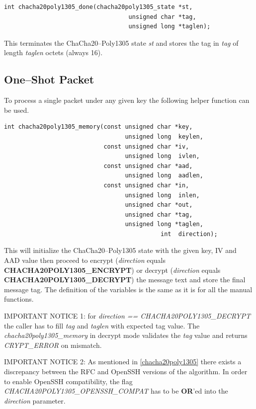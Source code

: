 \documentclass[synpaper]{book}
\begin{document}
\begin{verbatim}
int chacha20poly1305_done(chacha20poly1305_state *st,
                                   unsigned char *tag,
                                   unsigned long *taglen);
\end{verbatim}
This terminates the ChaCha20--Poly1305 state \textit{st} and stores the tag in \textit{tag} of length \textit{taglen} octets (always 16).

\subsection{One--Shot Packet}
To process a single packet under any given key the following helper function can be used.

\begin{verbatim}
int chacha20poly1305_memory(const unsigned char *key,
                                  unsigned long  keylen,
                            const unsigned char *iv,
                                  unsigned long  ivlen,
                            const unsigned char *aad,
                                  unsigned long  aadlen,
                            const unsigned char *in,
                                  unsigned long  inlen,
                                  unsigned char *out,
                                  unsigned char *tag,
                                  unsigned long *taglen,
                                            int  direction);
\end{verbatim}
This will initialize the ChaCha20--Poly1305 state with the given key, IV and AAD value then proceed to
encrypt (\textit{direction} equals \textbf{CHACHA20POLY1305\_ENCRYPT}) or decrypt (\textit{direction} equals
\textbf{CHACHA20POLY1305\_DECRYPT}) the message text and store the final message tag. The definition of the
variables is the same as it is for all the manual functions.

IMPORTANT NOTICE 1: for \textit{direction == CHACHA20POLY1305\_DECRYPT} the caller has to fill \textit{tag} and \textit{taglen} with expected
tag value. The \textit{chacha20poly1305\_memory} in decrypt mode validates the \textit{tag} value and returns \textit{CRYPT\_ERROR} on mismatch.

IMPORTANT NOTICE 2: As mentioned in \ref{chacha20poly1305} there exists a discrepancy between the RFC and OpenSSH versions of the algorithm.
In order to enable OpenSSH compatibility, the flag \textit{CHACHA20POLY1305\_OPENSSH\_COMPAT} has to be \textbf{OR}'ed into
the \textit{direction} parameter.
\end{document}

